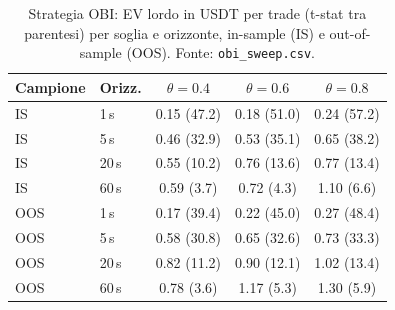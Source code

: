 \documentclass[a4paper,11pt]{article}
\newcommand{\code}[1]{\texttt{#1}}
\begin{document}
\begin{table}[H]
\centering
\small
\caption{Strategia OBI: EV lordo in USDT per trade (t-stat tra parentesi) per soglia e
orizzonte, in-sample (IS) e out-of-sample (OOS). Fonte: \code{obi\_sweep.csv}.}
\label{tab:obi-sweep}
\begin{tabular}{@{}llccc@{}}
\toprule
Campione & Orizz. & $\theta=0.4$ & $\theta=0.6$ & $\theta=0.8$ \\
\midrule
IS  & 1\,s  & 0.15 (47.2) & 0.18 (51.0) & 0.24 (57.2) \\
IS  & 5\,s  & 0.46 (32.9) & 0.53 (35.1) & 0.65 (38.2) \\
IS  & 20\,s & 0.55 (10.2) & 0.76 (13.6) & 0.77 (13.4) \\
IS  & 60\,s & 0.59 (3.7)  & 0.72 (4.3)  & 1.10 (6.6)  \\
\midrule
OOS & 1\,s  & 0.17 (39.4) & 0.22 (45.0) & 0.27 (48.4) \\
OOS & 5\,s  & 0.58 (30.8) & 0.65 (32.6) & 0.73 (33.3) \\
OOS & 20\,s & 0.82 (11.2) & 0.90 (12.1) & 1.02 (13.4) \\
OOS & 60\,s & 0.78 (3.6)  & 1.17 (5.3)  & 1.30 (5.9)  \\
\bottomrule
\end{tabular}
\end{table}
\end{document}
